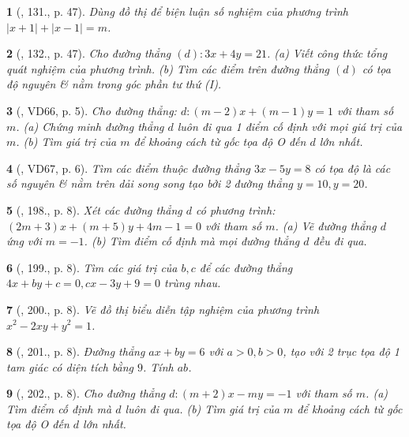 \documentclass{article}
\newtheorem{baitoan}{}
\begin{document}
\begin{baitoan}[\cite{Tuyen_Toan_9_old}, 131., p. 47]
	Dùng đồ thị để biện luận số nghiệm của phương trình $|x + 1| + |x - 1| = m$.
\end{baitoan}

\begin{baitoan}[\cite{Tuyen_Toan_9_old}, 132., p. 47]
	Cho đường thẳng $(d):3x + 4y = 21$. (a) Viết công thức tổng quát nghiệm của phương trình. (b) Tìm các điểm trên đường thẳng $(d)$ có tọa độ nguyên \& nằm trong góc phần tư thứ (I).
\end{baitoan}

\begin{baitoan}[\cite{Binh_Toan_9_tap_2}, VD66, p. 5]
	Cho đường thẳng: $d:(m - 2)x + (m - 1)y = 1$ với tham số $m$. (a) Chứng minh đường thẳng $d$ luôn đi qua 1 điểm cố định với mọi giá trị của $m$. (b) Tìm giá trị của $m$ để khoảng cách từ gốc tọa độ O đến $d$ lớn nhất.
\end{baitoan}

\begin{baitoan}[\cite{Binh_Toan_9_tap_2}, VD67, p. 6]
	Tìm các điểm thuộc đường thẳng $3x - 5y = 8$ có tọa độ là các số nguyên \& nằm trên dải song song tạo bởi 2 đường thẳng $y = 10,y = 20$.
\end{baitoan}

\begin{baitoan}[\cite{Binh_Toan_9_tap_2}, 198., p. 8]
	Xét các đường thẳng $d$ có phương trình: $(2m + 3)x + (m + 5)y + 4m - 1 = 0$ với tham số $m$. (a) Vẽ đường thẳng $d$ ứng với $m = -1$. (b) Tìm điểm cố định mà mọi đường thẳng $d$ đều đi qua.
\end{baitoan}

\begin{baitoan}[\cite{Binh_Toan_9_tap_2}, 199., p. 8]
	Tìm các giá trị của $b,c$ để các đường thẳng $4x + by + c = 0,cx - 3y + 9 = 0$ trùng nhau.
\end{baitoan}

\begin{baitoan}[\cite{Binh_Toan_9_tap_2}, 200., p. 8]
	Vẽ đồ thị biểu diễn tập nghiệm của phương trình $x^2 - 2xy + y^2 = 1$.
\end{baitoan}

\begin{baitoan}[\cite{Binh_Toan_9_tap_2}, 201., p. 8]
	Đường thẳng $ax + by = 6$ với $a > 0,b > 0$, tạo với 2 trục tọa độ 1 tam giác có diện tích bằng $9$. Tính $ab$.
\end{baitoan}

\begin{baitoan}[\cite{Binh_Toan_9_tap_2}, 202., p. 8]
	Cho đường thẳng $d:(m + 2)x - my = -1$ với tham số $m$. (a) Tìm điểm cố định mà $d$ luôn đi qua. (b) Tìm giá trị của $m$ để khoảng cách từ gốc tọa độ O đến $d$ lớn nhất.
\end{baitoan}
\end{document}

